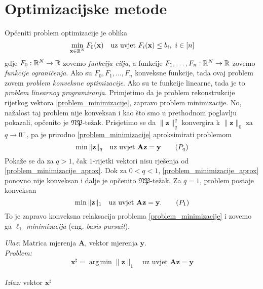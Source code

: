 \documentclass[a4paper,twoside,12pt]{memoir} %
\newcommand{\vect}[1]{\mathbf{#1}}
\renewcommand{\vec}{\vect}
\newcommand{\norm}[1]{\|{#1}\|}
\DeclareMathOperator*{\argmin}{arg\,min}
\newenvironment{alg}[1]
{
    \bigskip
    \begin{tcolorbox}[arc=0mm,boxrule=1.2pt,colframe=black,colback=white,detach title, before upper={\medskip\begin{center}\textbf{#1}\end{center}\hline\newline\medskip},frame hidden]
    \medskip
}
{
    \medskip
\end{tcolorbox}
    \bigskip
}
\begin{document}
\section[Optimizacijske metode][Optimizacijske metode]{Optimizacijske metode}
Op\v{c}eniti problem optimizacije je oblika
\begin{equation*}
    \min_{\vec x \in \R^N} F_0(\vec x)\quad\text{uz uvjet }F_i(\vec x) \leq b_i,\ i \in [n]
\end{equation*}
gdje $F_0:\mathbb{R}^N \rightarrow \mathbb{R}$ zovemo \textit{funkcija cilja}, a funkcije $F_1, \dots, F_n: \mathbb{R}^N \rightarrow \mathbb{R}$ zovemo \textit{funkcije ograni\v{c}enja}. Ako su $F_0, F_1, \dots, F_n$ konveksne funkcije, tada ovaj problem zovem \textit{problem konveksne optimizacije}. Ako su te funkcije linearne, tada je to \textit{problem linearnog programiranja}. Primjetimo da je problem rekonstrukcije rijetkog vektora \eqref{problem_minimizacije}, zapravo problem minimizacije. No, na\v{z}alost taj problem nije konveksan i kao \v{s}to smo u prethodnom poglavlju pokazali, op\v{c}enito je $\mathfrak{NP}$-te\v{z}ak. Prisjetimo se da $\norm{\vec z}_q^q$ konvergira k $\norm{\vec z}_0$ za $q \rightarrow 0^+$, pa je prirodno  \eqref{problem_minimizacije} aproksimirati problemom
\begin{equation}
    \min \norm{\vec z}_q\quad\text{uz uvjet }\vec{Az}=\vec y\tag{$P_{q}$}\label{problem_minimizacije_aprox}
\end{equation}
Poka\v{z}e se da za $q > 1$, \v{c}ak $1$-rijetki vektori nisu rje\v{s}enja od \eqref{problem_minimizacije_aprox}. Dok za $0 < q < 1$, \eqref{problem_minimizacije_aprox} ponovno nije konveksan i dalje je op\v{c}enito $\mathfrak{NP}$-te\v{z}ak. Za $q=1$, problem postaje konveksan
\begin{equation}
    \min \norm{\vec z}_1 \quad \text{uz uvjet }\vec{Az}=\vec y.\tag{$P_{1}$}\label{problem_minimizacije_l1}
\end{equation}
To je zapravo konveksna relaksacija problema \eqref{problem_minimizacije} i zovemo ga $\ell_1$\textit{-minimizacija} (eng. \textit{basis pursuit}).

\begin{alg}{$\ell_1$-minimizacija}
    \textit{Ulaz:} Matrica mjerenja $\vec A$, vektor mjerenja $\vec y$. \\
    \textit{Problem:}
        \begin{equation}
            \vec x^{\sharp} = \argmin \norm{\vec z}_1 \quad \text{uz uvjet }\vec{Az}=\vec y\tag{$\ell_1-min$}\label{algoritam_l1_minimizacija}
        \end{equation} \\
        \textit{Izlaz:} vektor $\vec x^{\sharp}$
\end{alg}
\end{document}
